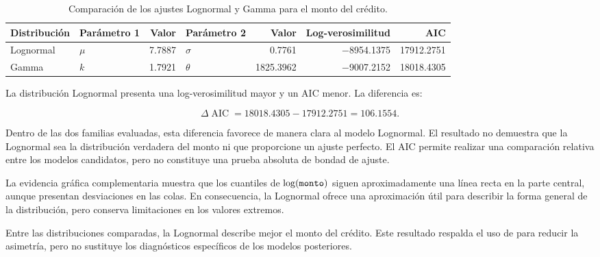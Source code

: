 \begin{table}[H]
    \centering
    \caption{Comparación de los ajustes Lognormal y Gamma para el monto
    del crédito.}
    \label{tab:comparacion-mle}

    \begin{tabular}{
        @{}
        l
        l
        r
        l
        r
        r
        r
        @{}
    }
        \toprule
        Distribución
        & Parámetro 1
        & Valor
        & Parámetro 2
        & Valor
        & Log-verosimilitud
        & AIC \\
        \midrule

        Lognormal
        & \(\mu\)
        & \num{7.7887}
        & \(\sigma\)
        & \num{0.7761}
        & \num{-8954.1375}
        & \num{17912.2751} \\

        Gamma
        & \(k\)
        & \num{1.7921}
        & \(\theta\)
        & \num{1825.3962}
        & \num{-9007.2152}
        & \num{18018.4305} \\

        \bottomrule
    \end{tabular}
\end{table}

La distribución Lognormal presenta una log-verosimilitud mayor y un AIC
menor. La diferencia es:

\[
\Delta\operatorname{AIC}
=
\num{18018.4305}
-
\num{17912.2751}
=
\num{106.1554}.
\]

Dentro de las dos familias evaluadas, esta diferencia favorece de manera
clara al modelo Lognormal. El resultado no demuestra que la Lognormal sea
la distribución verdadera del monto ni que proporcione un ajuste
perfecto. El AIC permite realizar una comparación relativa entre los
modelos candidatos, pero no constituye una prueba absoluta de bondad de
ajuste.

La evidencia gráfica complementaria muestra que los cuantiles de
\(\log(\texttt{monto})\) siguen aproximadamente una línea recta en la
parte central, aunque presentan desviaciones en las colas. En
consecuencia, la Lognormal ofrece una aproximación útil para describir la
forma general de la distribución, pero conserva limitaciones en los
valores extremos.

\begin{hallazgo}
Entre las distribuciones comparadas, la Lognormal describe mejor el
monto del crédito. Este resultado respalda el uso de
 para reducir la asimetría, pero no sustituye los
diagnósticos específicos de los modelos posteriores.
\end{hallazgo}

